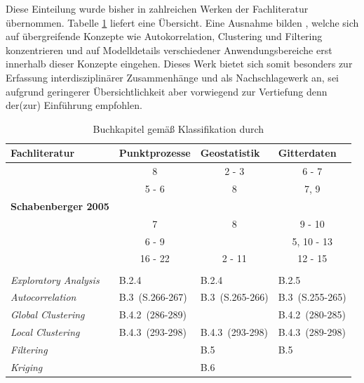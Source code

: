Diese Einteilung wurde bisher in zahlreichen Werken der Fachliteratur übernommen. 
Tabelle \ref{table_literature} liefert eine Übersicht. Eine Ausnahme 
bilden \cite{fischer_handbook_2010}, 
welche sich auf übergreifende Konzepte wie Autokorrelation, Clustering 
und Filtering konzentrieren 
und auf Modelldetails verschiedener Anwendungsbereiche erst 
innerhalb dieser Konzepte eingehen. Dieses Werk bietet sich somit besonders zur Erfassung 
interdisziplinärer Zusammenhänge und als Nachschlagewerk an, 
sei aufgrund geringerer Übersichtlichkeit aber vorwiegend zur 
Vertiefung denn der(zur) Einführung empfohlen.

\begin{table}[h!]
    \begin{center}
    \begin{tabular}{l l l l}
    \hline
        {\sc Fachliteratur}    & {\sc Punktprozesse} & {\sc Geostatistik} & {\sc Gitterdaten} \\
    \hline
        {\bf \cite{cressie_statistics_1993}}    & \multicolumn{1}{c}{8}  & \multicolumn{1}{c}{2 - 3} & \multicolumn{1}{c}{6 - 7} \\
        {\bf \cite{waller_applied_2004}}        & \multicolumn{1}{c}{5 - 6}  & \multicolumn{1}{c}{8} & \multicolumn{1}{c}{7, 9} \\
        {\bf Schabenberger 2005}        &   &   &   \\
        {\bf \cite{bivand_applied_2013}}        & \multicolumn{1}{c}{7}  & \multicolumn{1}{c}{8} & \multicolumn{1}{c}{9 - 10} \\
        {\bf \cite{anselin_perspectives_2010}}  & \multicolumn{1}{c}{6 - 9}  &   & \multicolumn{1}{c}{5, 10 - 13} \\
        {\bf \cite{gelfand_handbook_2010}}      & \multicolumn{1}{c}{16 - 22} & \multicolumn{1}{c}{2 - 11} & \multicolumn{1}{c}{12 - 15} \\
        {\bf \cite{fischer_handbook_2010}}  &                   &                   &   \\
    \cline{2-4}
        {\qquad \it Exploratory Analysis}  & B.2.4              & B.2.4             & B.2.5             \\
        {\qquad \it Autocorrelation}       & B.3 \,(S.266-267)  & B.3 \,(S.265-266) & B.3 \,(S.255-265) \\
        {\qquad \it Global Clustering}     & B.4.2 \,(286-289)  &                   & B.4.2 \,(280-285) \\
        {\qquad \it Local Clustering}      & B.4.3 \,(293-298)  & B.4.3 \,(293-298) & B.4.3 \,(289-298) \\
        {\qquad \it Filtering}             &                    & B.5               & B.5               \\
        {\qquad \it Kriging}               &                    & B.6               &                   \\
    \hline
    \end{tabular}
    \end{center}
    \caption{Buchkapitel gemäß Klassifikation durch \cite{cressie_statistics_1993}}
    \label{table_literature}
\end{table}
